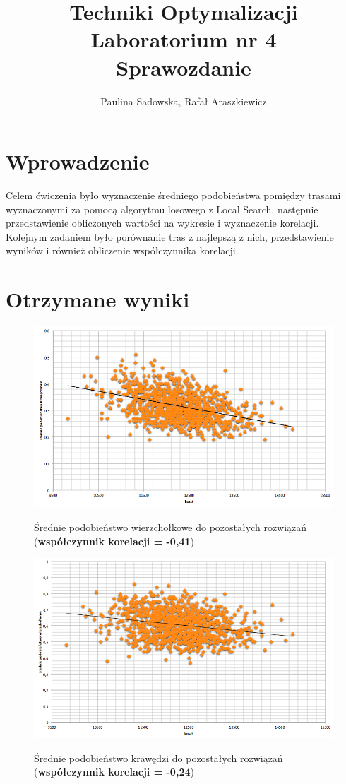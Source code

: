 \documentclass[a4paper 10pt]{article}
\title{\textbf{Techniki Optymalizacji} \\
Laboratorium nr 4 \\
Sprawozdanie}
\author{Paulina Sadowska, Rafał Araszkiewicz}
\begin{document}
\maketitle

\section{Wprowadzenie}
Celem ćwiczenia było wyznaczenie średniego podobieństwa pomiędzy trasami wyznaczonymi za pomocą algorytmu losowego z Local Search, następnie przedstawienie obliczonych wartości na wykresie i wyznaczenie korelacji. Kolejnym zadaniem było porównanie tras z najlepszą z nich, przedstawienie wyników i również obliczenie współczynnika korelacji.

\section{Otrzymane wyniki}

\begin{figure} [H]
\centering
\caption{Średnie podobieństwo wierzchołkowe do pozostałych rozwiązań (\textbf{współczynnik korelacji = -0,41})}
\includegraphics[angle=0,width = 1\textwidth, height=!]{images/edge.png}
\label{Rys. Edges}
\end{figure}

\begin{figure} [H]
\centering
\caption{Średnie podobieństwo krawędzi do pozostałych rozwiązań (\textbf{współczynnik korelacji = -0,24})}
\includegraphics[angle=0,width = 1\textwidth, height=!]{images/node.png}
\label{Rys. Node}
\end{figure}
\end{document}
